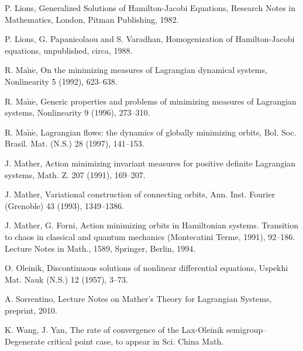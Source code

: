 \documentclass{amsart}[12pt]
\theoremstyle{definition}
\theoremstyle{remark}
\numberwithin{equation}{section}
\begin{document}
\begin{thebibliography}{00}
P. Lions, Generalized Solutions of Hamilton-Jacobi Equations,
Research Notes in Mathematics, London, Pitman Publishing, 1982.

P. Lions, G. Papanicolaou and S. Varadhan, Homogenization of
Hamilton-Jacobi equations, unpublished, circa, 1988.

R. Ma$\mathrm{\tilde{n}\acute{e}}$, On the minimizing measures of
Lagrangian dynamical systems, Nonlinearity 5 (1992), 623--638.

R. Ma$\mathrm{\tilde{n}\acute{e}}$, Generic properties and
problems of minimizing measures of Lagrangian systems,
Nonlinearity 9 (1996), 273--310.

R. Ma$\mathrm{\tilde{n}\acute{e}}$,  Lagrangian flows: the
dynamics of globally minimizing orbits, Bol. Soc. Brasil. Mat.
(N.S.) 28 (1997), 141--153.

J. Mather, Action minimizing invariant measures for positive
definite Lagrangian systems, Math. Z. 207 (1991), 169--207.

J. Mather, Variational construction of connecting orbits, Ann.
Inst. Fourier (Grenoble) 43 (1993), 1349--1386.

J. Mather, G. Forni, Action minimizing orbits in Hamiltonian
systems. Transition to chaos in classical and quantum mechanics
(Montecatini Terme, 1991), 92--186. Lecture Notes in Math., 1589,
Springer, Berlin, 1994.

O. Oleinik, Discontinuous solutions of nonlinear differential
equations, Uspekhi Mat. Nauk (N.S.) 12 (1957), 3--73.

A. Sorrentino, Lecture Notes on Mather's Theory for Lagrangian
Systems, preprint, 2010.

K. Wang, J. Yan, The rate of convergence of the Lax-Oleinik
semigroup--Degenerate critical point case, to appear in Sci. China
Math.

\end{thebibliography}
\end{document}
